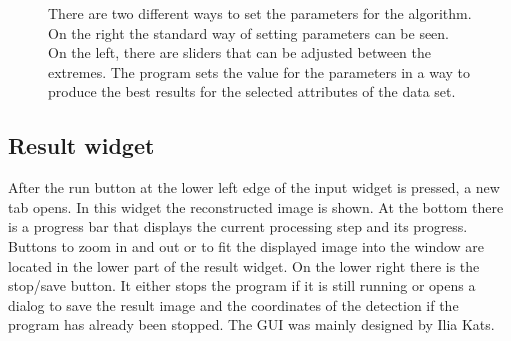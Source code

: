 \begin{figure}
\hfill
	\caption{There are two different ways to set the parameters for the algorithm. On the right the standard way of setting parameters can be seen. On the left, there are sliders that can be adjusted between the extremes. The program sets the value for the parameters in a way to produce the best results for the selected attributes of the data set.}
	\label{guiSettings}	
\end{figure}
\subsection{Result widget}
After the run button at the lower left edge of the input widget is pressed, a new tab opens. In this widget the reconstructed image is shown. At the bottom there is a progress bar that displays the current processing step and its progress. Buttons to zoom in and out or to fit the displayed image into the window are located in the lower part of the result widget. On the lower right there is the stop/save button. It either stops the program if it is still running or opens a dialog to save the result image and the coordinates of the detection if the program has already been stopped.\newline
The GUI was mainly designed by Ilia Kats.


